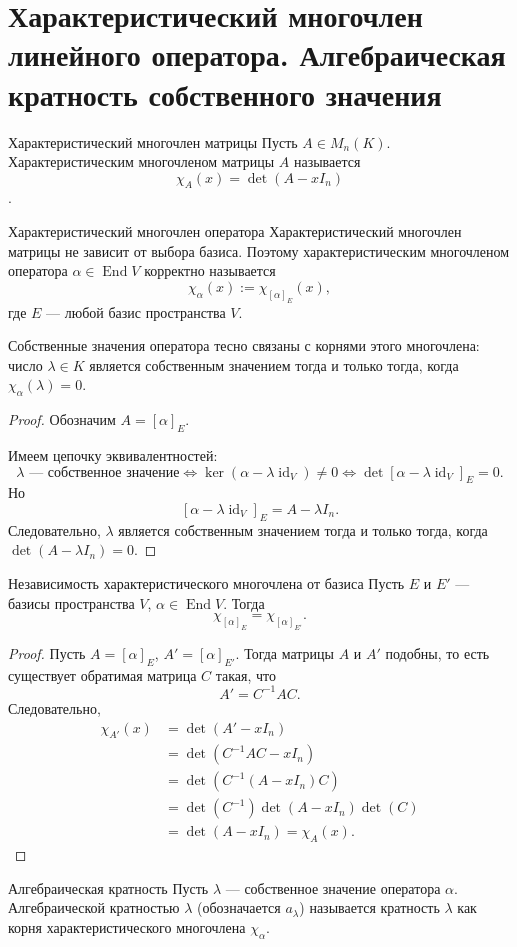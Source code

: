 
\section{Характеристический многочлен линейного оператора. Алгебраическая кратность собственного значения}

\begin{Definition}{Характеристический многочлен матрицы}{}
	Пусть $A\in M_n(K)$. Характеристическим многочленом матрицы $A$ называется
	\[
	\chi_A(x)=\det(A-xI_n)
	\].
\end{Definition}

\begin{Definition}{Характеристический многочлен оператора}{}
	Характеристический многочлен матрицы не зависит от выбора базиса. Поэтому характеристическим многочленом оператора $\alpha\in\operatorname{End} V$ корректно называется
	\[
	\chi_\alpha(x):=\chi_{[\alpha]_E}(x),
	\]
	где $E$ --- любой базис пространства $V$.
\end{Definition}

Собственные значения оператора тесно связаны с корнями этого многочлена: число $\lambda \in K$ является собственным значением тогда и только тогда, когда $\chi_\alpha(\lambda) = 0$.

\begin{proof}
	Обозначим $A=[\alpha]_E.$
	
	Имеем цепочку эквивалентностей:
	\[
	\lambda \text{ --- собственное значение}
	\Longleftrightarrow
	\ker(\alpha-\lambda\operatorname{id}_V)\ne 0
	\Longleftrightarrow
	\det[\alpha-\lambda\operatorname{id}_V]_E=0.
	\]
	Но
	\[
	[\alpha-\lambda\operatorname{id}_V]_E=A-\lambda I_n.
	\]
	Следовательно, $\lambda$ является собственным значением тогда и только тогда, когда
	$\det(A-\lambda I_n)=0$.
\end{proof}

\begin{Theorem}{Независимость характеристического многочлена от базиса}{}
	Пусть $E$ и $E'$ --- базисы пространства $V$, $\alpha\in\operatorname{End} V$.
	Тогда
	\[
	\chi_{[\alpha]_E}=\chi_{[\alpha]_{E'}}.
	\]
\end{Theorem}

\begin{proof}
	Пусть $A=[\alpha]_E$, $A'=[\alpha]_{E'}$.
	Тогда матрицы $A$ и $A'$ подобны, то есть существует обратимая матрица $C$ такая, что
	\[
	A'=C^{-1}AC.
	\]
	Следовательно,
	\begin{align*}
		\chi_{A'}(x)
		&=\det(A'-xI_n)\\
		&=\det(C^{-1}AC-xI_n)\\
		&=\det(C^{-1}(A-xI_n)C)\\
		&=\det(C^{-1})\det(A-xI_n)\det(C)\\
		&=\det(A-xI_n)
		=
		\chi_A(x).
	\end{align*}
\end{proof}

\begin{Definition}{Алгебраическая кратность}{}
	Пусть $\lambda$ --- собственное значение оператора $\alpha$. Алгебраической кратностью $\lambda$ (обозначается $a_\lambda$) называется кратность $\lambda$ как корня характеристического многочлена $\chi_\alpha$.
\end{Definition}
